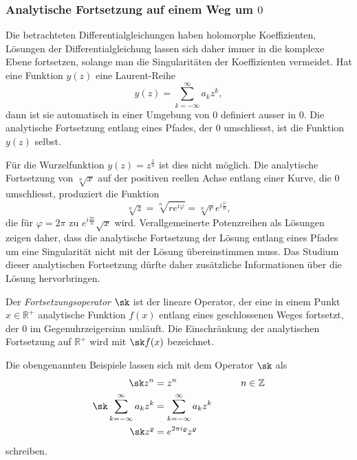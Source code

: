 %
%
\subsubsection{Analytische Fortsetzung auf einem Weg um $0$}
Die betrachteten Differentialgleichungen haben holomorphe
Koeffizienten, Lösungen der Differentialgleichung lassen sich
daher immer in die komplexe Ebene fortsetzen, solange man die
Singularitäten der Koeffizienten vermeidet.
Hat eine Funktion $y(z)$ eine Laurent-Reihe
\[
y(z) = \sum_{k=-\infty}^\infty a_kz^k,
\]
dann ist sie automatisch in einer Umgebung von $0$ definiert
ausser in $0$.
Die analytische Fortsetzung entlang eines Pfades, der $0$
umschliesst, ist die Funktion $y(z)$ selbst.

Für die Wurzelfunktion $y(z)=z^{\frac1n}$ ist dies nicht möglich.
Die analytische Fortsetzung von $\sqrt[n]{x}$ auf der positiven reellen
Achse entlang einer Kurve, die $0$ umschliesst,
produziert die Funktion
\[
\sqrt[n]{z}
=
\sqrt[n]{re^{i\varphi}}
=
\sqrt[n]{r}e^{i\frac{\varphi}n},
\]
die für $\varphi=2\pi$ zu $e^{i\frac{2\pi}n}\sqrt{x}$ wird.
Verallgemeinerte Potenzreihen als Lösungen zeigen daher, dass
die analytische Fortsetzung der Lösung entlang eines Pfades um
eine Singularität nicht mit der Lösung übereinstimmen muss.
Das Studium dieser analytischen Fortsetzung dürfte daher zusätzliche
Informationen über die Lösung hervorbringen.

\begin{definition}
Der {\em Fortsetzungsoperator} $\sk$ ist der lineare Operator, der eine
in einem Punkt $x\in\mathbb{R}^+$ analytische Funktion $f(x)$ entlang eines
geschlossenen Weges fortsetzt, der $0$ im Gegenuhrzeigersinn umläuft.
Die Einschränkung der analytischen Fortsetzung auf $\mathbb{R}^+$ wird
mit $\sk f(x)$ bezeichnet.
\end{definition}

Die obengenannten Beispiele lassen sich mit dem Operator $\sk$ als
\[
\begin{aligned}
\sk z^n
&=
z^n
&\qquad& n \in \mathbb{Z}
\\
\sk
\sum_{k=-\infty}^\infty a_kz^k
&=
\sum_{k=-\infty}^\infty a_kz^k
\\
\sk z^\varrho
&=
e^{2\pi i\varrho} z^\varrho
\end{aligned}
\]
schreiben.

%
%

